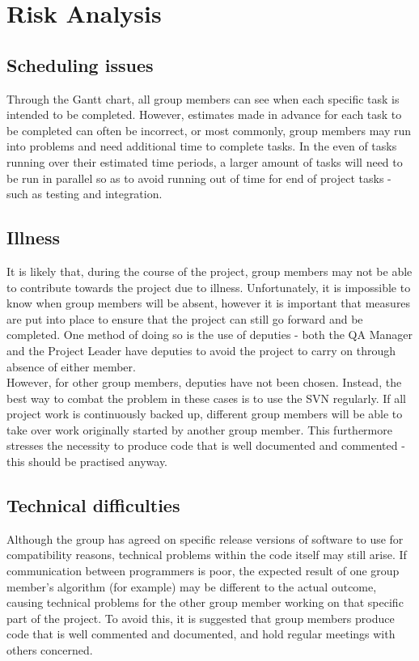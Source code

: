 \documentclass[a4paper]{article}
\begin{document}

\section{Risk Analysis}

\subsection{Scheduling issues}

Through the Gantt chart, all group members can see when each specific task is intended to be completed. However, estimates made in advance for each task to be completed can often be incorrect, or most commonly, group members may run into problems and need additional time to complete tasks. In the even of tasks running over their estimated time periods, a larger amount of tasks will need to be run in parallel so as to avoid running out of time for end of project tasks - such as testing and integration.

\subsection{Illness}

It is likely that, during the course of the project, group members may not be able to contribute towards the project due to illness. Unfortunately, it is impossible to know when group members will be absent, however it is important that measures are put into place to ensure that the project can still go forward and be completed. One method of doing so is the use of deputies - both the QA Manager and the Project Leader have deputies to avoid the project to carry on through absence of either member.\\

However, for other group members, deputies have not been chosen. Instead, the best way to combat the problem in these cases is to use the SVN regularly. If all project work is continuously backed up, different group members will be able to take over work originally started by another group member. This furthermore stresses the necessity to produce code that is well documented and commented - this should be practised anyway.

\subsection{Technical difficulties}

Although the group has agreed on specific release versions of software to use for compatibility reasons, technical problems within the code itself may still arise. If communication between programmers is poor, the expected result of one group member's algorithm (for example) may be different to the actual outcome, causing technical problems for the other group member working on that specific part of the project. To avoid this, it is suggested that group members produce code that is well commented and documented, and hold regular meetings with others concerned.
\end{document}

